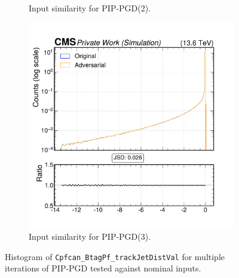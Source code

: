 \begin{figure}[h]
\begin{subfigure}[t]{0.32\textwidth}
    \caption*{Input similarity for PIP-PGD(2).}
  \end{subfigure}\hfill
  \begin{subfigure}[t]{0.32\textwidth}
    \includegraphics[width=\linewidth]{media/output/features/compare/combined_it_3/cmp_cpf_arr_Cpfcan_BtagPf_trackJetDistVal.pdf}
    \caption*{Input similarity for PIP-PGD(3).}
  \end{subfigure}

  \caption*{Histogram of \texttt{Cpfcan\_BtagPf\_trackJetDistVal} for multiple iterations of PIP-PGD tested against nominal inputs.}
  \label{fig:combined_input_Cpfcan_BtagPf_trackJetDistVal}
\end{figure}

